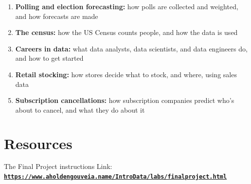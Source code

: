 \documentclass[12pt]{article}
\begin{document}
\begin{enumerate}
    \item \textbf{Polling and election forecasting:} how polls are collected and weighted, and how forecasts are made
    \item \textbf{The census:} how the US Census counts people, and how the data is used
    \item \textbf{Careers in data:} what data analysts, data scientists, and data engineers do, and how to get started
    \item \textbf{Retail stocking:} how stores decide what to stock, and where, using sales data
    \item \textbf{Subscription cancellations:} how subscription companies predict who's about to cancel, and what they do about it
\end{enumerate}

\section*{Resources}
The Final Project instructions
Link: \href{https://www.aholdengouveia.name/IntroData/labs/finalproject.html}{\textbf{\nolinkurl{https://www.aholdengouveia.name/IntroData/labs/finalproject.html}}}
\end{document}

